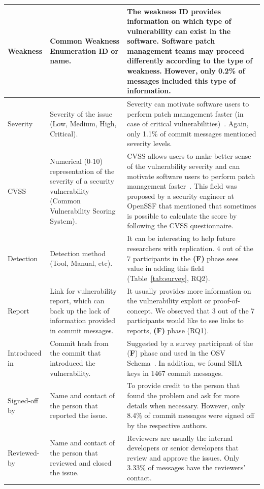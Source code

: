\begin{table}
\begin{tabular}{ | p{1.75cm} | p{4cm} | p{11cm} | }
        Weakness &  Common Weakness Enumeration ID or name. & The weakness ID provides information on which type of vulnerability can exist in the software. Software patch management teams may proceed differently according to the type of weakness. However, only 0.2\% of messages included this type of information. \\\hline
        Severity &  Severity of the issue (Low, Medium, High, Critical). & Severity can motivate software users to perform patch management faster (in case of critical vulnerabilities)~\cite{Householder2020}. Again, only 1.1\% of commit messages mentioned severity levels. \\\hline
        CVSS &  Numerical (0-10) representation of the severity of a security 
    vulnerability (Common Vulnerability Scoring System). & CVSS allows users to make better sense of the vulnerability severity and can motivate software users to perform patch management faster~\cite{Householder2020}. This field was proposed by a security engineer at OpenSSF that mentioned that sometimes is possible to calculate the score by following the CVSS questionnaire. \\\hline
        Detection &  Detection method (Tool, Manual, etc). & It can be interesting to help future researchers with replication. $4$ out of the $7$ participants in the \textbf{(F)} phase sees value in adding this field (Table~\ref{tab:survey}, RQ2). \\\hline
        Report & Link for vulnerability report, which can back up the lack of information provided in commit messages. & It usually provides more information on the vulnerability exploit or proof-of-concept. We observed that 3 out of the 7 participants would like to see links to reports, \textbf{(F)} phase (RQ1). \\\hline
        Introduced in & Commit hash from the commit that introduced the 
    vulnerability. & Suggested by a survey participant of the (\textbf{F}) phase and used in the OSV Schema~\cite{osv-schema}. In addition, we found SHA keys in 1467 commit messages.\\\hline
        Signed-off by & Name and contact of the person that reported the issue.  & To provide credit to the person that found the problem and ask for more details when necessary. However, only 8.4\% of commit messages were signed off by the respective authors.\\\hline
        Reviewed-by & Name and contact of the person that reviewed and closed the issue. & Reviewers are usually the internal developers or senior developers that review and approve the issues. Only 3.33\% of messages have the reviewers' contact.\\\hline

\end{tabular}
\end{table}
